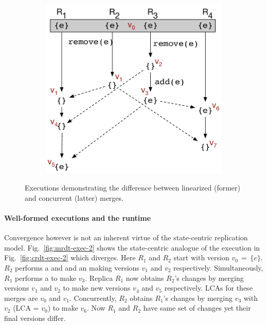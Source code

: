 \begin{figure}[ht]
\begin{subfigure}[t]{0.57\columnwidth}
    \includegraphics[scale=0.35]{Figures/mrdt-execs-4}
    \caption{}
    \label{fig:mrdt-exec-4}
  \end{subfigure}
  \caption{Executions demonstrating the difference between linearized
  (former) and concurrent (latter) merges.}
\label{fig:mrdt-execs-2}
\vspace*{-0.25in}
\end{figure}

\noindent\paragraph{Well-formed executions and the \quark runtime}
Convergence however is not an inherent virtue of the state-centric
replication model. Fig.~\ref{fig:mrdt-exec-2} shows the state-centric
analogue of the execution in Fig.~\ref{fig:crdt-exec-2} which
diverges. Here $R_1$ and $R_2$ start with version $v_0 \,=\, \{e\}$.
$R_2$ performs a  and and an  making versions
$v_1$ and $v_2$ respectively. Simultaneously, $R_1$ performs a
 to make $v_3$. Replica $R_1$ now obtains $R_2$'s changes by
merging versions $v_1$ and $v_2$ to make new versions $v_4$ and $v_5$
respectively. LCAs for these merges are $v_0$ and $v_1$. Concurrently,
$R_2$ obtains $R_1$'s changes by merging $v_3$ with $v_2$ (LCA =
$v_0$) to make $v_6$.  Now $R_1$ and $R_2$ have same set of changes
yet their final versions differ.

